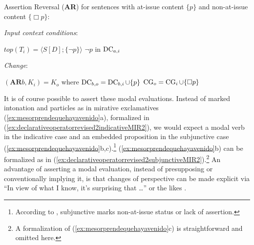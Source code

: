 \begin{exe}
\ex\label{ex:assertiondenialOBV} 
Assertion Reversal (\textbf{AR}) for sentences with at-issue content $\{ p \}$ and non-at-issue content $\{ \Box p \}$:
	\begin{xlist}
		\ex \textit{Input context conditions}: 
		\begin{xlist}
			\ex $\textit{top}(T_i)=\langle S [D];\{\neg p \}\rangle$
			\ex $\neg p$ in $\operatorname{DC}_{a,i}$ 
		\end{xlist}
		
		\ex \textit{Change}:
		\begin{xlist}
			\ex $(\textbf{AR}b,K_i)=K_o$ where $\operatorname{DC}_{b,o}=\operatorname{DC}_{b,i}\cup \{ p \}$ 
			\ex $\operatorname{CG}_{o} = \operatorname{CG}_{i} \cup \{ \Box p \}$
		\end{xlist}
	\end{xlist}
\end{exe}

It is of course possible to assert these modal evaluations. Instead of marked intonation and particles as in mirative exclamatives (\ref{ex:mesorprendequehayavenido}a), formalized in (\ref{ex:declarativeoperatorrevised2indicativeMIR2}), we would expect a modal verb in the indicative case and an embedded proposition in the subjunctive case (\ref{ex:mesorprendequehayavenido}b,c).\footnote{According to \citet[3]{Palmer.2001}, subjunctive marks non-at-issue status or lack of assertion.} (\ref{ex:mesorprendequehayavenido}b) can be formalized as in (\ref{ex:declarativeoperatorrevised2subjunctiveMIR2}).\footnote{A formalization of (\ref{ex:mesorprendequehayavenido}c) is straightforward and omitted here.} An advantage of asserting a modal evaluation, instead of presupposing or conventionally implying it, is that changes of perspective can be made explicit via ``In view of what I know, it's surprising that \ldots'' or the likes \citep{Kratzer.1981}. 

